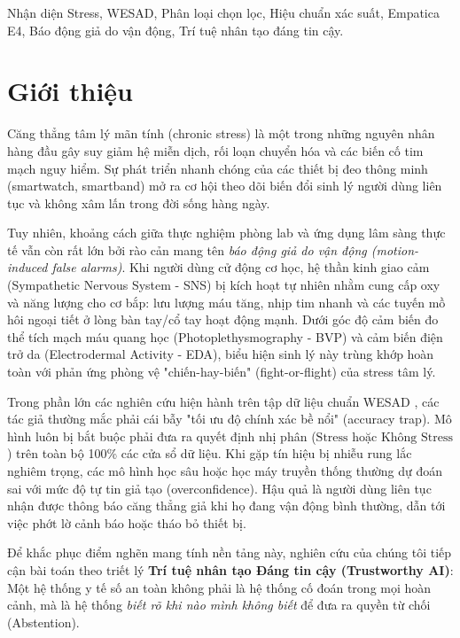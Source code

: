 \documentclass[conference]{IEEEtran}
\begin{document}
\begin{IEEEkeywords}
Nhận diện Stress, WESAD, Phân loại chọn lọc, Hiệu chuẩn xác suất, Empatica E4, Báo động giả do vận động, Trí tuệ nhân tạo đáng tin cậy.
\end{IEEEkeywords}

\section{Giới thiệu}
Căng thẳng tâm lý mãn tính (chronic stress) là một trong những nguyên nhân hàng đầu gây suy giảm hệ miễn dịch, rối loạn chuyển hóa và các biến cố tim mạch nguy hiểm. Sự phát triển nhanh chóng của các thiết bị đeo thông minh (smartwatch, smartband) mở ra cơ hội theo dõi biến đổi sinh lý người dùng liên tục và không xâm lấn trong đời sống hàng ngày.

Tuy nhiên, khoảng cách giữa thực nghiệm phòng lab và ứng dụng lâm sàng thực tế vẫn còn rất lớn bởi rào cản mang tên \textit{báo động giả do vận động (motion-induced false alarms)}. Khi người dùng cử động cơ học, hệ thần kinh giao cảm (Sympathetic Nervous System - SNS) bị kích hoạt tự nhiên nhằm cung cấp oxy và năng lượng cho cơ bắp: lưu lượng máu tăng, nhịp tim nhanh và các tuyến mồ hôi ngoại tiết ở lòng bàn tay/cổ tay hoạt động mạnh. Dưới góc độ cảm biến đo thể tích mạch máu quang học (Photoplethysmography - BVP) và cảm biến điện trở da (Electrodermal Activity - EDA), biểu hiện sinh lý này trùng khớp hoàn toàn với phản ứng phòng vệ "chiến-hay-biến" (fight-or-flight) của stress tâm lý. 

Trong phần lớn các nghiên cứu hiện hành trên tập dữ liệu chuẩn WESAD \cite{schmidt2018wesad, bobade2020stress}, các tác giả thường mắc phải cái bẫy "tối ưu độ chính xác bề nổi" (accuracy trap). Mô hình luôn bị bắt buộc phải đưa ra quyết định nhị phân ($\text{Stress}$ hoặc $\text{Không Stress}$) trên toàn bộ 100\% các cửa sổ dữ liệu. Khi gặp tín hiệu bị nhiễu rung lắc nghiêm trọng, các mô hình học sâu hoặc học máy truyền thống thường dự đoán sai với mức độ tự tin giả tạo (overconfidence). Hậu quả là người dùng liên tục nhận được thông báo căng thẳng giả khi họ đang vận động bình thường, dẫn tới việc phớt lờ cảnh báo hoặc tháo bỏ thiết bị.

Để khắc phục điểm nghẽn mang tính nền tảng này, nghiên cứu của chúng tôi tiếp cận bài toán theo triết lý \textbf{Trí tuệ nhân tạo Đáng tin cậy (Trustworthy AI)}: Một hệ thống y tế số an toàn không phải là hệ thống cố đoán trong mọi hoàn cảnh, mà là hệ thống \textit{biết rõ khi nào mình không biết} để đưa ra quyền từ chối (Abstention). 
\end{document}
